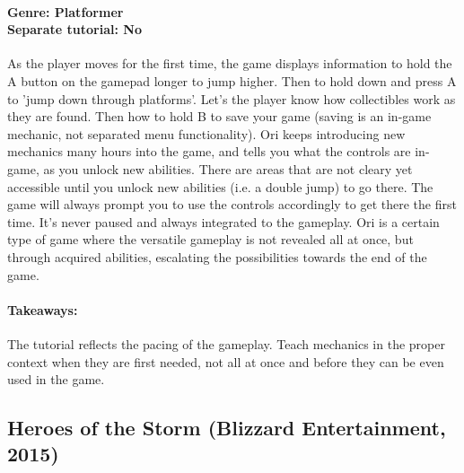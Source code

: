 \paragraph{Genre: Platformer \\ Separate tutorial: No \\}
As the player moves for the first time, the game displays information to hold the A button on the gamepad longer to jump higher.
Then to hold down and press A to 'jump down through platforms'.
Let's the player know how collectibles work as they are found.
Then how to hold B to save your game (saving is an in-game mechanic, not separated menu functionality).
Ori keeps introducing new mechanics many hours into the game, and tells you what the controls are in-game, as you unlock new abilities.
There are areas that are not cleary yet accessible until you unlock new abilities (i.e. a double jump) to go there. The game will always prompt you to use the controls accordingly to get there the first time. It's never paused and always integrated to the gameplay.
Ori is a certain type of game where the versatile gameplay is not revealed all at once, but through acquired abilities, escalating the possibilities towards the end of the game.
\paragraph{Takeaways:}
The tutorial reflects the pacing of the gameplay. Teach mechanics in the proper context when they are first needed, not all at once and before they can be even used in the game.

\subsection{Heroes of the Storm (Blizzard Entertainment, 2015)}
